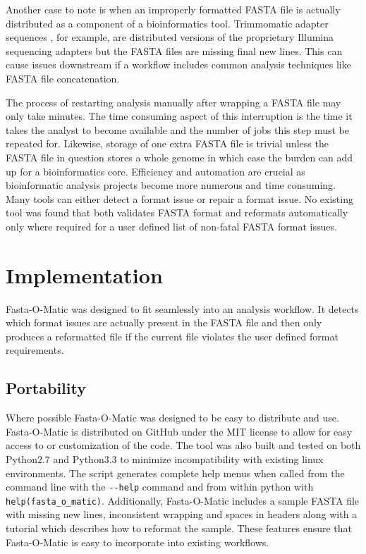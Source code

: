 \documentclass{bmcart}
\begin{document}
Another case to note is when an improperly formatted FASTA file is actually distributed as a component of a bioinformatics tool. Trimmomatic adapter sequences \cite{bolger2014trimmomatic}, for example, are distributed versions of the proprietary Illumina sequencing adapters but the FASTA files are missing final new lines. This can cause issues downstream if a workflow includes common analysis techniques like FASTA file concatenation. 

The process of restarting analysis manually after wrapping a FASTA file may only take minutes. The time consuming aspect of this interruption is the time it takes the analyst to become available and the number of jobs this step must be repeated for. Likewise, storage of one extra FASTA file is trivial unless the FASTA file in question stores a whole genome in which case the burden can add up for a bioinformatics core. Efficiency and automation are crucial as bioinformatic analysis projects become more numerous and time consuming. Many tools can either detect a format issue or repair a format issue. No existing tool was found that both validates FASTA format and reformats automatically only where required for a user defined list of non-fatal FASTA format issues.

\section{Implementation}

Fasta-O-Matic was designed to fit seamlessly into an analysis workflow. It detects which format issues are actually present in the FASTA file and then only produces a reformatted file if the current file violates the user defined format requirements. 


\subsection{Portability}

Where possible Fasta-O-Matic was designed to be easy to distribute and use. Fasta-O-Matic is distributed on GitHub under the MIT license to allow for easy access to or customization of the code. The tool was also built and tested on both Python2.7 and Python3.3 to minimize incompatibility with existing linux environments. The script generates complete help menus when called from the command line with the \verb|--help| command and from within python with \verb|help(fasta_o_matic)|. Additionally, Fasta-O-Matic includes a sample FASTA file with missing new lines, inconsistent wrapping and spaces in headers along with a tutorial which describes how to reformat the sample. These features ensure that Fasta-O-Matic is easy to incorporate into existing workflows.
\end{document}
